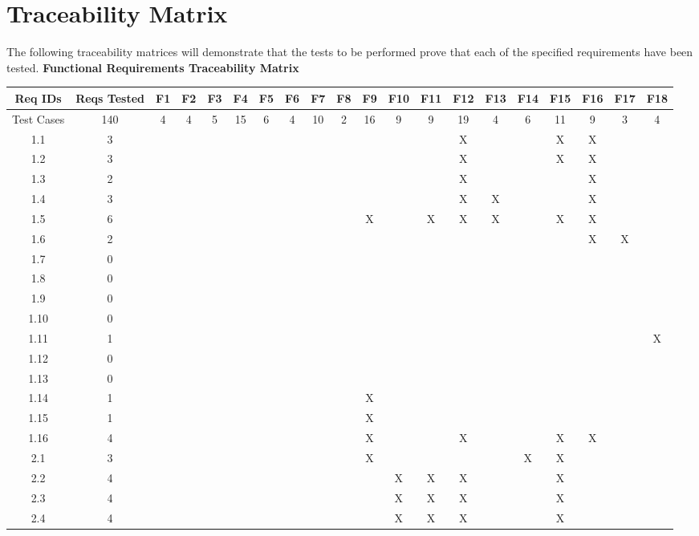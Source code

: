 \documentclass[titlepage]{article}
\begin{document}
\section{Traceability Matrix}
The following traceability matrices will demonstrate that the tests to be performed prove that each of the specified requirements have been tested.
\newpage
\large{\textbf{Functional Requirements Traceability Matrix}}
\begin{center}
\begin{table}[h!]
\hspace*{-7.5mm}
\begin{tabular}{|c|c|c|c|c |c|c|c|c|c |c|c|c|c|c |c|c|c|c|c|}\hline
\multicolumn{1}{|C{1.5}|}{Req IDs}	&\multicolumn{1}{|C{1}|}{Reqs Tested}	&F1	&F2	&F3	&F4	&F5	&F6	&F7	&F8	&F9	&F10	&F11	&F12	&F13	&F14	&F15	&F16	&F17	&F18\\\hline
\multicolumn{1}{|C{1.5}|}{Test Cases}&140 &4 &4 &5 &15 &6 &4 &10 &2 &16 &9 &9 &19 &4 &6 &11 &9 &3 &4\\\hline
1.1 &3&&& &&&&& &&&&X& &&X&X&&\\\hline
1.2 &3&&& &&&&& &&&&X& &&X&X&&\\\hline
1.3 &2&&& &&&&& &&&&X& &&&X&&\\\hline
1.4 &3&&& &&&&& &&&&X&X &&&X&&\\\hline
1.5 &6&&& &&&&& &X&&X&X&X &&X&X&&\\\hline
1.6 &2&&& &&&&& &&&&& &&&X&X&\\\hline
1.7 &0&&& &&&&& &&&&& &&&&&\\\hline
1.8 &0&&& &&&&& &&&&& &&&&&\\\hline
1.9 &0&&& &&&&& &&&&& &&&&&\\\hline
1.10 &0&&& &&&&& &&&&& &&&&&\\\hline
1.11 &1&&& &&&&& &&&&& &&&&&X\\\hline
1.12 &0&&& &&&&& &&&&& &&&&&\\\hline
1.13 &0&&& &&&&& &&&&& &&&&&\\\hline
1.14 &1&&& &&&&& &X&&&& &&&&&\\\hline
1.15 &1&&& &&&&& &X&&&& &&&&&\\\hline
1.16 &4&&& &&&&& &X&&&X& &&X&X&&\\\hline
2.1 &3&&& &&&&& &X&&&& &X&X&&&\\\hline
2.2 &4&&& &&&&& &&X&X&X& &&X&&&\\\hline
2.3 &4&&& &&&&& &&X&X&X& &&X&&&\\\hline
2.4 &4&&& &&&&& &&X&X&X& &&X&&&\\\hline

\end{tabular}
\end{table}
\end{center}
\end{document}

